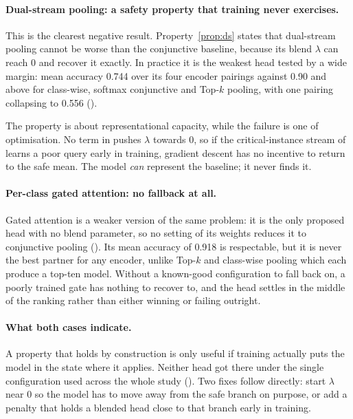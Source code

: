 \paragraph{Dual-stream pooling: a safety property that training never exercises.}
This is the clearest negative result. Property~\ref{prop:ds} states that dual-stream pooling cannot
be worse than the conjunctive baseline, because its blend $\lambda$ can reach 0 and recover it
exactly. In practice it is the weakest head tested by a wide margin: mean \webtraffic{} accuracy
0.744 over its four encoder pairings against 0.90 and above for class-wise, softmax conjunctive and
Top-$k$ pooling, with one pairing collapsing to 0.556 ().

The property is about representational capacity, while the failure is one of optimisation. No term
in  pushes $\lambda$ towards 0, so if the critical-instance stream of
 learns a poor query early in training, gradient descent has no incentive to return
to the safe mean. The model \emph{can} represent the baseline; it never finds it.

\paragraph{Per-class gated attention: no fallback at all.}
Gated attention is a weaker version of the same problem: it is the only proposed head with no blend
parameter, so no setting of its weights reduces it to conjunctive pooling ().
Its mean \webtraffic{} accuracy of 0.918 is respectable, but it is never the best partner for any
encoder, unlike Top-$k$ and class-wise pooling which each produce a top-ten model. Without a
known-good configuration to fall back on, a poorly trained gate has nothing to recover to, and the
head settles in the middle of the ranking rather than either winning or failing outright.

\paragraph{What both cases indicate.}
A property that holds by construction is only useful if training actually puts the model in the
state where it applies. Neither head got there under the single configuration used across the whole
study (). Two fixes follow directly: start $\lambda$ near 0 so the model has
to move away from the safe branch on purpose, or add a penalty that holds a blended head close to
that branch early in training.

